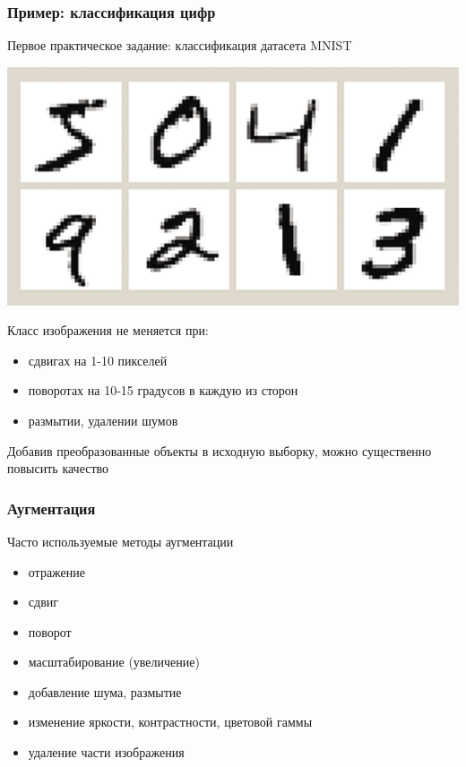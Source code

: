 \documentclass[fleqn, xcolor=x11names]{beamer}
\begin{document}
\begin{frame}[fragile]\frametitle{Пример: классификация цифр}
Первое практическое задание: классификация датасета MNIST

\hfill

\begin{center}
{\includegraphics[scale=1]{images/mnist.png}}
\end{center}

\hfill

Класс изображения не меняется при:
\begin{itemize}
\item сдвигах на 1-10 пикселей

\item поворотах на 10-15 градусов в каждую из сторон

\item размытии, удалении шумов
\end{itemize}

\hfill

Добавив преобразованные объекты в исходную выборку, можно существенно повысить качество
\end{frame}

\begin{frame}[fragile]\frametitle{Аугментация}
Часто используемые методы аугментации
\begin{itemize}
\item отражение
\item сдвиг
\item поворот
\item масштабирование (увеличение)
\item добавление шума, размытие
\item изменение яркости, контрастности, цветовой гаммы
\item удаление части изображения
\end{itemize}	


\href{https://medium.com/nanonets/how-to-use-deep-learning-when-you-have-limited-data-part-2-data-augmentation-c26971dc8ced}{\color{blue}{Хорошая статья по аугментации изображений}}

\end{frame}
\end{document}
